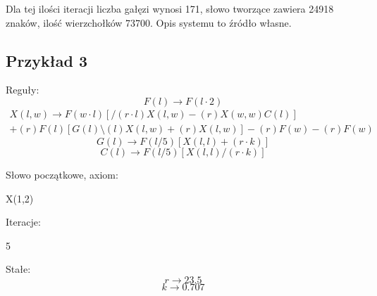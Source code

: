 \documentclass[12pt]{report}
\begin{document}
\begin{sloppypar}


Dla tej ilości iteracji liczba gałęzi wynosi 171, słowo tworzące zawiera 24918 znaków, ilość wierzchołków 73700. Opis systemu to źródło własne.

\subsection*{Przykład 3}
Reguły:
\begin{equation*}
F(l)\rightarrow F(l\cdot2) 
\end{equation*}
\begin{multline*}
X(l,w) \rightarrow F(w\cdot l)[/(r\cdot l)X(l,w)-(r)X(w,w)C(l)]\\
+(r)F(l)[G(l)\setminus(l)X(l,w)+(r)X(l,w)]-(r)F(w)-(r)F(w)
\end{multline*}
\begin{equation*}
G(l) \rightarrow F(l/5)[X(l,l)+(r\cdot k)]
\end{equation*}
\begin{equation*}
C(l) \rightarrow F(l/5)[X(l,l)/(r\cdot k)]
\end{equation*}



Słowo początkowe, axiom:
\begin{center}
X(1,2)
\end{center}
Iteracje:
\begin{center}
5
\end{center}
Stałe:
\begin{equation*}
r\rightarrow 23.5
\end{equation*}
\begin{equation*}
k\rightarrow 0.707
\end{equation*}






\end{sloppypar}
\end{document}
